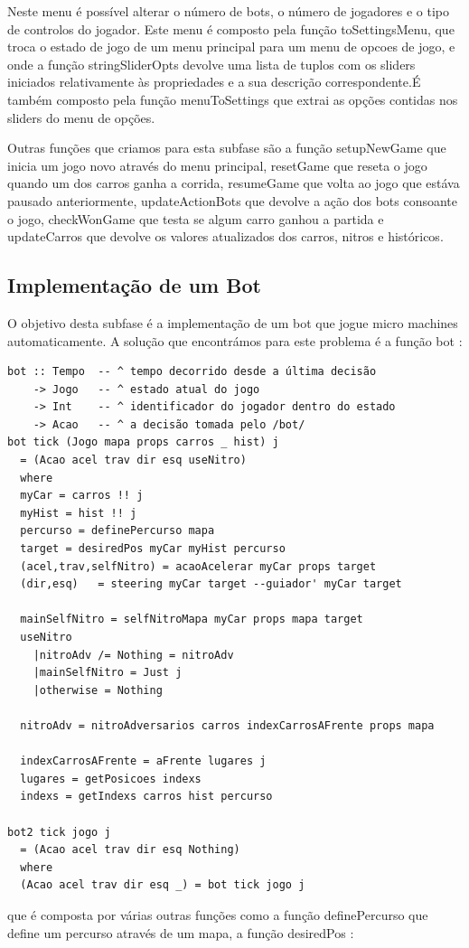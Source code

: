 \documentclass[a4paper]{report} %
\begin{document}
Neste menu é possível alterar o número de bots, o número de jogadores e o tipo de controlos do jogador.
Este menu é composto pela função toSettingsMenu, que troca o estado de jogo de um menu principal para um menu de opcoes de jogo, e onde a função stringSliderOpts devolve uma lista de tuplos com os sliders iniciados relativamente às propriedades e a sua descrição correspondente.É também composto pela função menuToSettings que extrai as opções contidas nos sliders do menu de opções.

Outras funções que criamos para esta subfase são a função setupNewGame que inicia um jogo novo através do menu principal, resetGame que reseta o jogo quando um dos carros ganha a corrida, resumeGame que volta ao jogo que estáva pausado anteriormente, updateActionBots que devolve a ação dos bots consoante o jogo, checkWonGame que testa se algum carro ganhou a partida e updateCarros que devolve os valores atualizados dos carros, nitros e históricos.


\subsection{Implementação de um Bot}

O objetivo desta subfase é a implementação de um bot que jogue micro machines automaticamente.
A solução que encontrámos para este problema é a função bot : 

\begin{verbatim}
bot :: Tempo  -- ^ tempo decorrido desde a última decisão
    -> Jogo   -- ^ estado atual do jogo
    -> Int    -- ^ identificador do jogador dentro do estado
    -> Acao   -- ^ a decisão tomada pelo /bot/
bot tick (Jogo mapa props carros _ hist) j 
  = (Acao acel trav dir esq useNitro)
  where
  myCar = carros !! j
  myHist = hist !! j
  percurso = definePercurso mapa
  target = desiredPos myCar myHist percurso
  (acel,trav,selfNitro) = acaoAcelerar myCar props target
  (dir,esq)   = steering myCar target --guiador' myCar target

  mainSelfNitro = selfNitroMapa myCar props mapa target  
  useNitro
    |nitroAdv /= Nothing = nitroAdv
    |mainSelfNitro = Just j
    |otherwise = Nothing

  nitroAdv = nitroAdversarios carros indexCarrosAFrente props mapa

  indexCarrosAFrente = aFrente lugares j
  lugares = getPosicoes indexs 
  indexs = getIndexs carros hist percurso

bot2 tick jogo j
  = (Acao acel trav dir esq Nothing)
  where
  (Acao acel trav dir esq _) = bot tick jogo j

\end{verbatim}
que é composta por várias outras funções como a função definePercurso que define um percurso através de um mapa, a função desiredPos :
\end{document}
